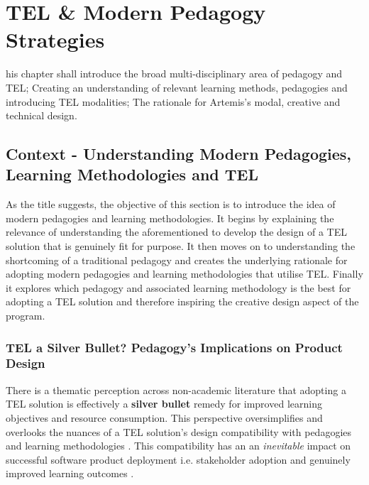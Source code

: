 %
%
\let\textcircled=\pgftextcircled
\chapter{TEL \& Modern Pedagogy Strategies}
\label{chap:TEL and Modern Pedagogical Strategies}


his chapter shall introduce the broad multi-disciplinary area of pedagogy and TEL; Creating an understanding of relevant learning methods, pedagogies and introducing TEL modalities; The rationale for Artemis's modal, creative and technical design.

\section{Context - Understanding Modern Pedagogies, Learning Methodologies and TEL}

As the title suggests, the objective of this section is to introduce the idea of modern pedagogies and learning methodologies. It begins by explaining the relevance of understanding the aforementioned to develop the design of a TEL solution that is genuinely fit for purpose. It then moves on to understanding the shortcoming of  a traditional pedagogy and creates the underlying rationale for adopting modern pedagogies and learning methodologies that utilise TEL. Finally it explores which pedagogy and associated learning methodology is the best for adopting a TEL solution and therefore inspiring the creative design aspect of the program.

\label{sec:sec01}
\subsection{TEL a Silver Bullet? Pedagogy's Implications on Product Design}
\label{subsec:subsec01}

There is a thematic perception across non-academic literature that adopting a TEL solution is effectively a \textbf{silver bullet} remedy for improved learning objectives and resource consumption. This perspective oversimplifies and overlooks the nuances of a TEL solution's design compatibility with pedagogies and learning methodologies \cite{RickReis,Means2009,Team2008,Gordon2014,Burge2011}. This compatibility has an an \textit{inevitable} impact on successful software product deployment i.e. stakeholder adoption \cite{Mahamuni2015} and genuinely improved learning outcomes \cite{RickReis,Means2009,Team2008}.

